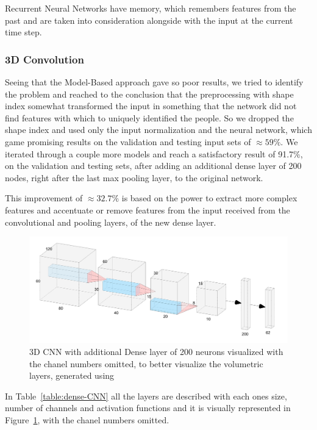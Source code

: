 \documentclass[12pt]{article}
\theoremstyle{definition}
\begin{document}
	Recurrent Neural Networks have memory, which remembers features from the past and are taken into consideration alongside with the input at the current time step.

	\subsubsection{3D Convolution}

	Seeing that the Model-Based approach gave so poor results, we tried to identify the problem and reached to the conclusion that the preprocessing with shape index somewhat transformed the input in something that the network did not find features with which to uniquely identified the people. So we dropped the shape index and used only the input normalization and the neural network, which game promising results on the validation and testing input sets of $\approx 59\%$. We iterated through a couple more models and reach a satisfactory result of 91.7\%, on the validation and testing sets, after adding an additional dense layer of 200 nodes, right after the last max pooling layer, to the original network.

	This improvement of $\approx 32.7\%$ is based on the power to extract more complex features and accentuate or remove features from the input received from the convolutional and pooling layers, of the new dense layer.

	\begin{figure}[ht]
		\includegraphics[width=\textwidth]{networks/3D-CNN-200-Dense.png}
		\caption{3D CNN with additional Dense layer of 200 neurons visualized with the chanel numbers omitted, to better visualize the volumetric layers, generated using \cite{nn-svg}}
		\label{figure:3D-CNN-200-Dense}
	\end{figure}

	In Table~\ref{table:dense-CNN} all the layers are described with each ones size, number of channels and activation functions and it is visually represented in Figure~\ref{figure:3D-CNN-200-Dense}, with the chanel numbers omitted.
\end{document}
